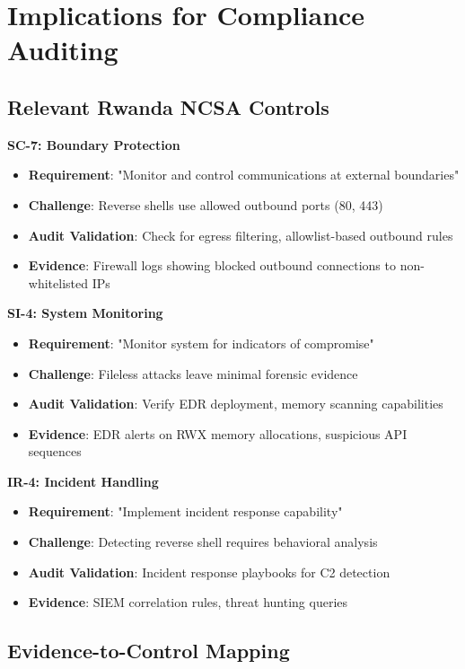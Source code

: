 \documentclass[11pt,conference]{IEEEtran}
\begin{document}
\section{Implications for Compliance Auditing}

\subsection{Relevant Rwanda NCSA Controls}

\textbf{SC-7: Boundary Protection}
\begin{itemize}
    \item \textbf{Requirement}: "Monitor and control communications at external boundaries"
    \item \textbf{Challenge}: Reverse shells use allowed outbound ports (80, 443)
    \item \textbf{Audit Validation}: Check for egress filtering, allowlist-based outbound rules
    \item \textbf{Evidence}: Firewall logs showing blocked outbound connections to non-whitelisted IPs
\end{itemize}

\textbf{SI-4: System Monitoring}
\begin{itemize}
    \item \textbf{Requirement}: "Monitor system for indicators of compromise"
    \item \textbf{Challenge}: Fileless attacks leave minimal forensic evidence
    \item \textbf{Audit Validation}: Verify EDR deployment, memory scanning capabilities
    \item \textbf{Evidence}: EDR alerts on RWX memory allocations, suspicious API sequences
\end{itemize}

\textbf{IR-4: Incident Handling}
\begin{itemize}
    \item \textbf{Requirement}: "Implement incident response capability"
    \item \textbf{Challenge}: Detecting reverse shell requires behavioral analysis
    \item \textbf{Audit Validation}: Incident response playbooks for C2 detection
    \item \textbf{Evidence}: SIEM correlation rules, threat hunting queries
\end{itemize}

\subsection{Evidence-to-Control Mapping}
\end{document}
